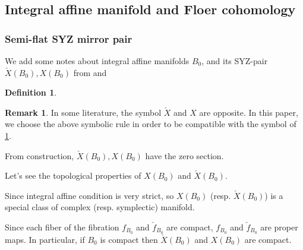 \documentclass[a4paper,dvipdfmx,reqno,12pt]{amsart}
\theoremstyle{definition}
\newtheorem{definition}[theorem]{Definition}
\newtheorem{remark}[theorem]{Remark}
\numberwithin{equation}{section}
\begin{document}
\subsection{Integral affine manifold and Floer cohomology}

\subsubsection{Semi-flat SYZ mirror pair}

We add some notes about integral affine manifolds $B_0$, and its SYZ-pair $\check{X}(B_0), X(B_0)$ from \cite[Chapter 6]{MR2567952} and \cite{MR2737696,MR3079343}

\begin{definition}
\label{definition-SYZ-torus-fibration}
\end{definition}

\begin{remark}
In some literature, the symbol $\check{X}$ and
$X$ are opposite. In this paper, we choose the above
symbolic rule in order to be compatible with the symbol of 
\cref{definition-SYZ-torus-fibration}.
\end{remark}

From construction, $\check{X}(B_0), X(B_0)$ have the zero section.

Let's see the topological properties of $X(B_0)$ and $\check{X}(B_0)$.

Since integral affine condition is very strict, so $X(B_0)$ (resp. $\check{X}(B_0)$) is a special class of complex (resp. symplectic) manifold.

Since each fiber of the fibration $f_{B_0}$ and $\check{f}_{B_0}$ are compact, $f_{B_0}$ and $\check{f}_{B_0}$ are proper maps. In particular, if $B_0$ is compact then $\check{X}(B_0)$ and $X(B_0)$ are compact.
\end{document}
